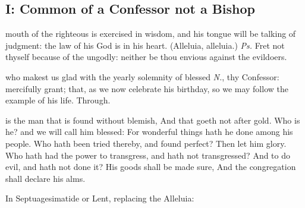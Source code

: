 \subsection{I: Common of a Confessor not a Bishop}\label{CommonConfessorNotBishopI}

\introit
{} mouth of the righteous is exercised in wisdom, and his tongue will be talking of judgment: the law of his God is in his heart. (Alleluia, alleluia.) \textit{Ps.} Fret not thyself because of the ungodly: neither be thou envious against the evildoers.

\collect
{} who makest us glad with the yearly solemnity of blessed \textit{N.}, thy Confessor: mercifully grant; that, as we now celebrate his birthday, so we may follow the example of his life. Through.

\label{CommonConfessorNotBishopIEpistle}
 is the man that is found without blemish, And that goeth not after gold. Who is he? and we will call him blessed: For wonderful things hath he done among his people. Who hath been tried thereby, and found perfect? Then let him glory. Who hath had the power to transgress, and hath not transgressed? And to do evil, and hath not done it? His goods shall be made sure, And the congregation shall declare his alms. 



\begin{rubric}
{In Septuagesimatide or Lent, replacing the Alleluia:}
\end{rubric}

\vspace{-1ex}

